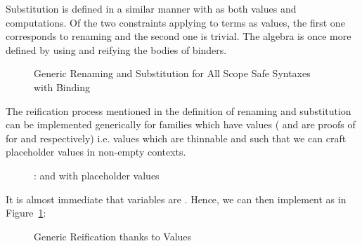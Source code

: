 Substitution is defined in a similar manner with  as both
values and computations. Of the two constraints applying to terms as
values, the first one corresponds to renaming and the second
one is trivial. The algebra is once more defined by using 
and reifying the bodies of binders.

\begin{figure}[h]
\begin{minipage}{0.5\textwidth}
\end{minipage}\hfill
\begin{minipage}{0.5\textwidth}
\end{minipage}
\caption{Generic Renaming and Substitution for All Scope Safe Syntaxes with Binding}
\end{figure}

The reification process mentioned in the definition of renaming
and substitution can be implemented generically for \semrec{}
families which have  values ( and 
are proofs of  for  and  respectively) i.e.
values which are thinnable and such that we can craft placeholder values
in non-empty contexts.

\begin{figure}[h]
\caption{:  and with placeholder values}
\end{figure}

\label{sec:varlike:base}

It is almost immediate that variables are . Hence, we can
then implement  as in Figure~\ref{fig:genericreify}:
\begin{figure}[h]
\caption{Generic Reification thanks to  Values}\label{fig:genericreify}
\end{figure}


